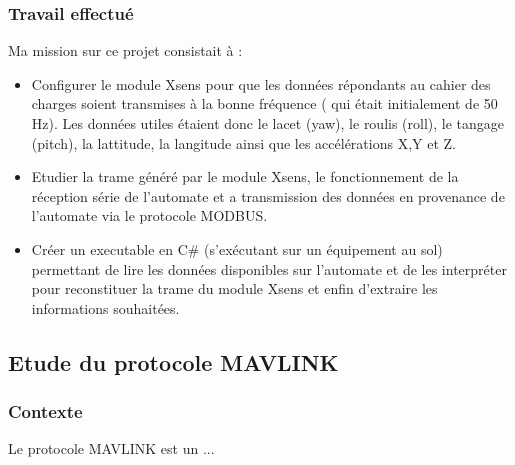 \subsubsection{Travail effectué}

Ma mission sur ce projet consistait à : 
\newline
\begin{itemize}
	\item Configurer le module Xsens pour que les données répondants au cahier des charges soient transmises à la bonne fréquence ( qui était initialement de 50 Hz). Les données utiles étaient donc le lacet (yaw), le roulis (roll), le tangage (pitch), la lattitude, la langitude ainsi que les accélérations X,Y et Z. 
	\item Etudier la trame généré par le module Xsens, le fonctionnement de la réception série de l'automate et a transmission des données en provenance de l'automate via le protocole MODBUS. 
	\item Créer un executable en C\# (s'exécutant sur un équipement au sol) permettant de lire les données disponibles sur l'automate et de les interpréter pour reconstituer la trame du module Xsens et enfin d'extraire les informations souhaitées. 

\end{itemize}

\subsection{Etude du protocole MAVLINK }

\subsubsection{Contexte}

Le protocole MAVLINK est un ...

